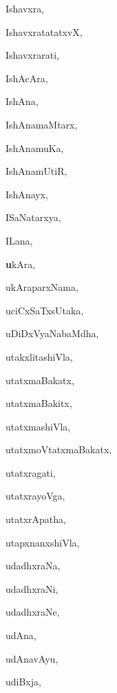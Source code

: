 \begin{multicols}{3}
{\noindent
{Ishavxra}, \pageref{Ishavxra}

\noindent
{IshavxratatatxvX}, \pageref{IshavxratatatxvX}

\noindent
{Ishavxrarati}, \pageref{Ishavxrarati}

\noindent
{IshAcAra}, \pageref{IshAcAra}

\noindent
{IshAna}, \pageref{IshAna}

\noindent
{IshAnamaMtarx}, \pageref{IshAnamaMtarx}

\noindent
{IshAnamuKa}, \pageref{IshAnamuKa}

\noindent
{IshAnamUtiR}, \pageref{IshAnamUtiR}

\noindent
{IshAnayx}, \pageref{IshAnayx}

\noindent
{ISaNatarxya}, \pageref{ISaNatarxya}

\noindent
{ILana}, \pageref{ILana}

\noindent
{{\large\bf{u}}kAra}, \pageref{ukAra}

\noindent
{ukAraparxNama}, \pageref{ukAraparxNama}

\noindent
{uciCxSaTxsUtaka}, \pageref{uciCxSaTxsUtaka}

\noindent
{uDiDxVyaNabaMdha}, \pageref{uDiDxVyaNabaMdha}

\noindent
{utakxlitashiVla}, \pageref{utakxlitashiVla}

\noindent
{utatxmaBakatx}, \pageref{utatxmaBakatx}

\noindent
{utatxmaBakitx}, \pageref{utatxmaBakitx}

\noindent
{utatxmashiVla}, \pageref{utatxmashiVla}

\noindent
{utatxmoVtatxmaBakatx}, \pageref{utatxmoVtatxmaBakatx}

\noindent
{utatxragati}, \pageref{utatxragati}

\noindent
{utatxrayoVga}, \pageref{utatxrayoVga}

\noindent
{utatxrApatha}, \pageref{utatxrApatha}

\noindent
{utapxnanxshiVla}, \pageref{utapxnanxshiVla}

\noindent
{udadhxraNa}, \pageref{udadhxraNa}

\noindent
{udadhxraNi}, \pageref{udadhxraNi}

\noindent
{udadhxraNe}, \pageref{udadhxraNe}

\noindent
{udAna}, \pageref{udAna}

\noindent
{udAnavAyu}, \pageref{udAnavAyu}

\noindent
{udiBxja}, \pageref{udiBxja}

}
\end{multicols}
